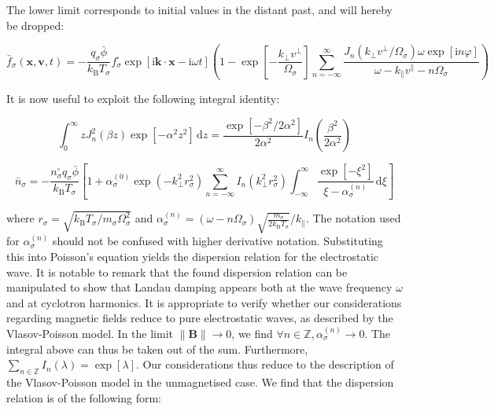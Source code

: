 The lower limit corresponds to initial values in the distant past, and will hereby be dropped:

\begin{equation}
    \bar{f}_\sigma(\mathbf{x},\mathbf{v},t)=-\frac{q_\sigma\bar{\phi}}{k_\mathrm{B}T_\sigma}f_\sigma^\square\exp{\left[\mathrm{i}\mathbf{k}\cdot\mathbf{x}-\mathrm{i}\omega t\right]}\left(1-\exp{\left[-\frac{k_\perp v^\perp}{\Omega_\sigma}\right]}\sum_{n=-\infty}^\infty\frac{J_n\left(k_\perp v^\perp/\Omega_\sigma\right)\omega\exp{[\mathrm{i}n\varphi]}}{\omega-k_\parallel v^\parallel-n\Omega_\sigma}\right)
\end{equation}

It is now useful to exploit the following integral identity:

\begin{equation}
    \int_{0}^\infty zJ_n^2(\beta z)\exp{\left[-\alpha^2z^2\right]}\,\mathrm{d}z=\frac{\exp{\left[-\beta^2/2\alpha^2\right]}}{2\alpha^2}I_n\left(\frac{\beta^2}{2\alpha^2}\right)
\end{equation}

\begin{equation}
    \bar{n}_\sigma=-\frac{n_\sigma^\square q_\sigma\bar{\phi}}{k_\mathrm{B}T_\sigma}\left[1+\alpha_{\sigma}^{(0)}\exp{(-k_\perp^2 r_\sigma^2)}\sum_{n=-\infty}^\infty I_n\left(k_\perp^2r_\sigma^2\right)\int_{-\infty}^\infty\frac{\exp{\left[-\xi^2\right]}}{\xi-\alpha_{\sigma}^{(n)}}\,\mathrm{d}\xi\right]
\end{equation}

where $r_\sigma=\sqrt{k_\mathrm{B}T_\sigma/m_\sigma\Omega_\sigma^2}$ and $\alpha_{\sigma}^{(n)}=(\omega-n\Omega_\sigma)\sqrt{\frac{m_\sigma}{2k_\mathrm{B}T_\sigma}}/k_\parallel$. The notation used for $\alpha_\sigma^{(n)}$ should not be confused with higher derivative notation. Substituting this into Poisson's equation yields the dispersion relation for the electrostatic wave. It is notable to remark that the found dispersion relation can be manipulated to show that Landau damping appears both at the wave frequency $\omega$ and at cyclotron harmonics. It is appropriate to verify whether our considerations regarding magnetic fields reduce to pure electrostatic waves, as described by the Vlasov-Poisson model. In the limit $\|\mathbf{B}\|\to0$, we find $\forall n\in\mathbb{Z},\alpha_\sigma^{(n)}\to0$. The integral above can thus be taken out of the sum. Furthermore, $\sum_{n\in\mathbb{Z}}I_n(\lambda)=\exp{[\lambda]}$. Our considerations thus reduce to the description of the Vlasov-Poisson model in the unmagnetised case. We find that the dispersion relation is of the following form:


